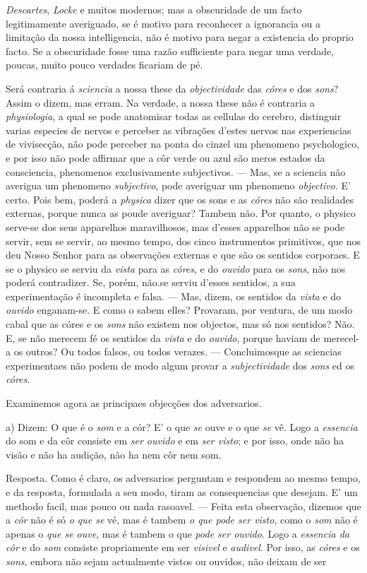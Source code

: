 \emph{Descartes}, \emph{Locke} e muitos modernos; mas a obscuridade de um facto legitimamente averiguado, se é motivo para reconhecer a ignorancia ou a limitação da nossa intelligencia, não é motivo para negar a existencia do proprio facto. Se a obscuridade fosse uma razão sufficiente para negar uma verdade, poucas, muito pouco verdades ficariam de pé.\par Será contraria á \emph{sciencia} a nossa these da \emph{objectividade} das \emph{córes} e dos \emph{sons}? Assim o dizem, mas erram. Na verdade, a nossa these não é contraria a \emph{physiologia}, a qual se pode anatomisar todas as cellulas do cerebro, distinguir varias especies de nervos e perceber as vibrações d'estes nervos nas experiencias de vivisecção, não pode perceber na ponta do cinzel um phenomeno psychologico, e por isso não pode affirmar que a côr verde ou azul são meros estados da consciencia, phenomenos exclusivamente subjectivos. --- Mas, se a sciencia não averigua um phenomeno \emph{subjectivo}, pode averiguar um phenomeno \emph{objectivo}. E' certo. Pois bem, poderá a \emph{physica} dizer que os sons e as \emph{córes} não são realidades externas, porque nunca as poude averiguar? Tambem não. Por quanto, o physico serve-se dos seus apparelhos maravilhosos, mas d'esses apparelhos não se pode servir, sem se servir, ao mesmo tempo, dos cinco instrumentos primitivos, que nos deu Nosso Senhor para as observações externas e que são os sentidos corporaes. E se o physico se serviu da \emph{vista} para as \emph{córes}, e do \emph{ouvido} para os \emph{sons}, não nos poderá contradizer. Se, porém, não.se serviu d'esses sentidos, a sua experimentação é incompleta e falsa. --- Mas, dizem, os sentidos da \emph{vista} e do \emph{ouvido} enganam-se. E como o sabem elles? Provaram, por ventura, de um modo cabal que as córes e os \emph{sons} não existem nos objectos, mas só nos sentidos? Não. E, se não merecem fé os sentidos da \emph{vista} e do \emph{ouvido}, porque haviam de merecel-a os outros? Ou todos falsos, ou todos verazes. --- Concluimosque as sciencias experimentaes não podem de modo algum provar a \emph{subjectividade} dos \emph{sons} ed os \emph{córes}.\par Examinemos agora as principaes objecções dos adversarios.\par a) Dizem: O que é o \emph{som} e a cór? E' o que \emph{se} ouve e o que \emph{se} vê. Logo a \emph{essencia} do som e da côr consiste em \emph{ser ouvido} e em \emph{ser visto}; e por isso, onde não ha visão e não ha audição, não ha nem côr nem som.\par Resposta. Como é claro, os adversarios perguntam e respondem ao mesmo tempo, e da resposta, formulada a seu modo, tiram as consequencias que desejam. E' um methodo facil, mas pouco ou nada rasoavel. --- Feita esta observação, dizemos que a \emph{cór} não é só \emph{o que se} vé, mas é tambem \emph{o que pode ser visto}, como o \emph{som} não é apenas o \emph{que se ouve}, mas é tambem o que \emph{pode ser ouvido}. Logo a \emph{essencia da côr} e do \emph{som} consiste propriamente em ser \emph{visivel} e \emph{audivel}. Por isso, as \emph{córes} e os \emph{sons}, embora não sejam actualmente vistos ou ouvidos, não deixam de ser 